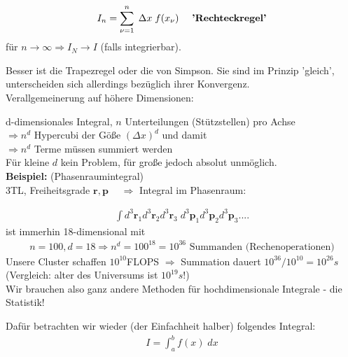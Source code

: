 \documentclass[12pt]{article}
\begin{document}
\begin{align}
I_n= \sum_{\nu =1}^n \; \Delta x \; f(x_\nu) \quad \mbox{ \textbf{'Rechteckregel'}}
\end{align}
für $n \to \infty \Rightarrow I_N \to I$ (falls integrierbar).

Besser ist die Trapezregel oder die von Simpson. Sie sind im Prinzip 'gleich', unterscheiden sich allerdings bezüglich ihrer Konvergenz. \\

Verallgemeinerung auf höhere Dimensionen:

d-dimensionales Integral, $n$ Unterteilungen (Stützstellen) pro Achse \\
$\Rightarrow n^d$ Hypercubi der Göße $(\Delta x)^d$ und damit \\
$\Rightarrow n^d$ Terme müssen summiert werden\\
Für kleine $d$ kein Problem, für große jedoch absolut unmöglich. \\

\textbf{Beispiel:} (Phasenraumintegral) \\
 3TL, Freiheitsgrade $\mathbf{r}, \mathbf{p} \; \quad \Rightarrow$ Integral im Phasenraum: 

\begin{align*}
\int d^3 \mathbf{r}_1 d^3 \mathbf{r}_2 d^3 \mathbf{r}_3 \; d^3 \mathbf{p}_1 d^3 \mathbf{p}_2 d^3 \mathbf{p}_3 .... 
\end{align*} %
ist immerhin 18-dimensional mit 
\begin{align*}
 n=100, d=18 \Rightarrow n^d=100^{18}=10^{36} \mbox{ Summanden (Rechenoperationen)}
\end{align*} 
Unsere Cluster schaffen $10^{10}$FLOPS
$\Rightarrow$ Summation dauert $10^{36 } / 10^{10}= 10^{26}s$ \\ (Vergleich: alter des Universums ist $10^{19}s$!) \\
Wir brauchen also ganz andere Methoden für hochdimensionale Integrale - die Statistik! 

Dafür betrachten wir wieder (der Einfachheit halber) folgendes Integral:
\begin{align}
I= \int_a^b f(x) \; dx
\end{align}
\end{document}
